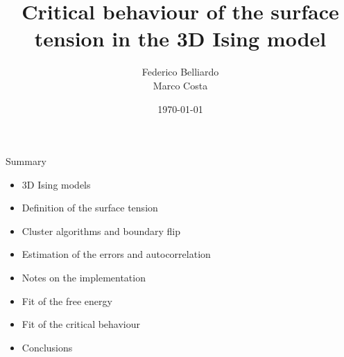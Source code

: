 \documentclass[12pt,handout]{beamer}
\title[]{Critical behaviour of the surface tension in the 3D Ising model} %
\author[]
{
Federico Belliardo \\
Marco Costa
}
\institute[] %
{
Dipartimento di Fisica\\ %
Università di Pisa \\
\medskip
}
\date{\today} %
\begin{document}
\begin{frame}
\titlepage %
\end{frame}



\begin{frame}{Summary}

\begin{center}

\begin{itemize}
\item 3D Ising models
\item Definition of the surface tension
\item Cluster algorithms and boundary flip
\item Estimation of the errors and autocorrelation
\item Notes on the implementation
\item Fit of the free energy
\item Fit of the critical behaviour
\item Conclusions
\end{itemize}

\end{center}
\end{frame}
\end{document}
